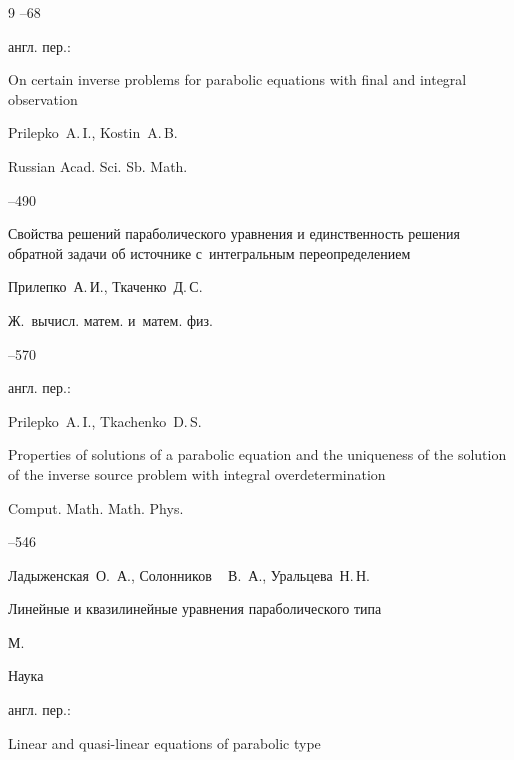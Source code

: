 \begin{thebibliography}{9}
--68

\transl англ. пер.:~

\paper On certain inverse problems for parabolic equations with final and integral observation

\by  Prilepko~A.\,I., Kostin~A.\,B.

\jour Russian Acad. Sci. Sb. Math.




--490




\paper Свойства решений параболического уравнения и единственность решения обратной задачи об источнике с~интегральным переопределением

\by Прилепко~А.\,И., Ткаченко~Д.\,С.

\jour Ж.~вычисл. матем. и~матем. физ.




--570

\transl англ. пер.:~

\by Prilepko~A.\,I., Tkachenko~D.\,S.

\paper Properties of solutions of a parabolic equation and the uniqueness of the solution of the inverse source problem with integral overdetermination

\jour Comput. Math. Math. Phys.



--546 







\by Ладыженская~О.\, А., Солонников ~ В.\, А., Уральцева~Н.\,Н.

\book Линейные и квазилинейные уравнения параболического типа

\publaddr М.

\publ Наука



\transl англ. пер.:~

\book Linear and quasi-linear equations of parabolic type 


\end{thebibliography}
